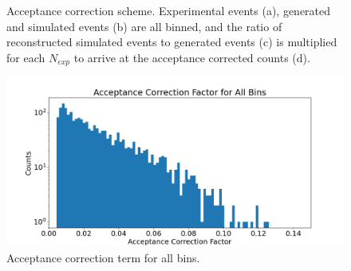 \begin{figure}[H]
        \hfill
    
        \caption[Acceptance Correction Scheme]{Acceptance correction scheme. Experimental events (a), generated and simulated events (b) are all binned, and the ratio of reconstructed simulated events to generated events (c) is multiplied for each $N_{exp}$ to arrive at the acceptance corrected counts (d).}\label{fig:acccorr}
\end{figure}



\begin{figure}
    \centering
    \includegraphics[width=\textwidth]{Chapters/Ch4-BaseAnalysis/4_Correction_Factors/A3_a_acceptance_correction/pics/acccorr.png}
    \caption{Acceptance correction term for all bins.}
    \label{fig:acccorrdist}
\end{figure}




